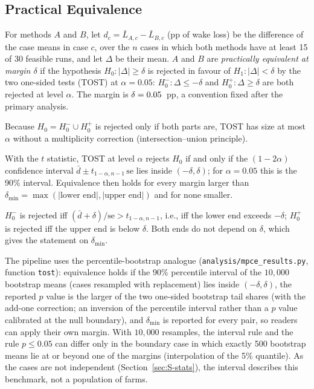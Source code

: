 \subsection{Practical Equivalence}
\label{sec:S-th-equiv}
\begin{defS}
\label{def:S-equiv}
For methods $A$ and $B$, let $d_c=\bar L_{A,c}-\bar L_{B,c}$ (pp of wake loss) be the difference of the case means in case $c$, over the $n$ cases in which both methods have at least 15 of 30 feasible runs, and let $\Delta$ be their mean. $A$ and $B$ are \emph{practically equivalent at margin $\delta$} if the hypothesis $H_0\colon\lvert\Delta\rvert\ge\delta$ is rejected in favour of $H_1\colon\lvert\Delta\rvert<\delta$ by the two one-sided tests (TOST) at $\alpha=0.05$: $H_0^-\colon\Delta\le-\delta$ and $H_0^+\colon\Delta\ge\delta$ are both rejected at level $\alpha$. The margin is $\delta=0.05$~pp, a convention fixed after the primary analysis.
\end{defS}
Because $H_0=H_0^-\cup H_0^+$ is rejected only if both parts are, TOST has size at most $\alpha$ without a multiplicity correction (intersection--union principle).

\begin{lemS}
\label{lem:S-tost-ci}
With the $t$ statistic, TOST at level $\alpha$ rejects $H_0$ if and only if the $(1-2\alpha)$ confidence interval $\bar d\pm t_{1-\alpha,n-1}\,\mathrm{se}$ lies inside $(-\delta,\delta)$; for $\alpha=0.05$ this is the 90\% interval. Equivalence then holds for every margin larger than $\delta_{\min}=\max(\lvert\text{lower end}\rvert,\lvert\text{upper end}\rvert)$ and for none smaller.
\end{lemS}
\begin{thSproof}
$H_0^-$ is rejected iff $(\bar d+\delta)/\mathrm{se}>t_{1-\alpha,n-1}$, i.e., iff the lower end exceeds $-\delta$; $H_0^+$ is rejected iff the upper end is below $\delta$. Both ends do not depend on $\delta$, which gives the statement on $\delta_{\min}$.
\end{thSproof}
The pipeline uses the percentile-bootstrap analogue (\texttt{analysis/mpce\_results.py}, function \texttt{tost}): equivalence holds if the 90\% percentile interval of the $10{,}000$ bootstrap means (cases resampled with replacement) lies inside $(-\delta,\delta)$, the reported $p$ value is the larger of the two one-sided bootstrap tail shares (with the add-one correction; an inversion of the percentile interval rather than a $p$ value calibrated at the null boundary), and $\delta_{\min}$ is reported for every pair, so readers can apply their own margin. With $10{,}000$ resamples, the interval rule and the rule $p\le0.05$ can differ only in the boundary case in which exactly 500 bootstrap means lie at or beyond one of the margins (interpolation of the 5\% quantile). As the cases are not independent (Section~\ref{sec:S-stats}), the interval describes this benchmark, not a population of farms.

